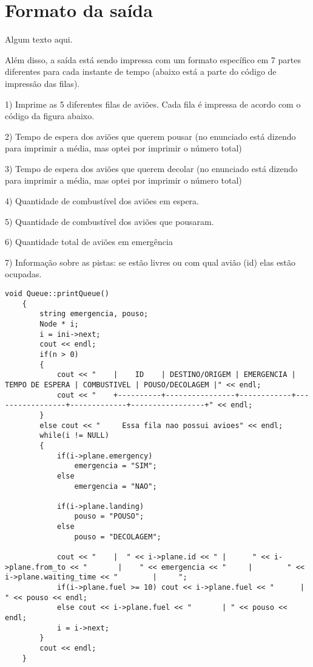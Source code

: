 \documentclass[a4paper,11pt]{article}
\theoremstyle{mytheor}
\begin{document}
\section*{Formato da saída}

Algum texto aqui.\newline

Além disso, a saída está sendo impressa com um formato específico em 7 partes diferentes  para cada instante de tempo (abaixo está a parte do código de impressão das filas).\newline

1) Imprime as 5 diferentes filas de aviões. Cada fila é impressa de acordo com o código da figura abaixo. \newline

2) Tempo de espera dos aviões que querem pousar (no enunciado está dizendo para imprimir a média, mas optei por imprimir o número total)\newline

3) Tempo de espera dos aviões que querem decolar (no enunciado está dizendo para imprimir a média, mas optei por imprimir o número total)\newline

4) Quantidade de combustível dos aviões em espera. \newline

5) Quantidade de combustível dos aviões que pousaram.\newline

6) Quantidade total de aviões em emergência \newline

7) Informação sobre as pistas: se estão livres ou com qual avião (id) elas estão ocupadas.\newline

\begin{lstlisting}[label={list:first},caption= Parte do código em queue.h que imprime informações dos aviões (C++).]
    void Queue::printQueue()
    {
        string emergencia, pouso;
        Node * i;
        i = ini->next;
        cout << endl;
        if(n > 0)
        { 
            cout << "    |    ID    | DESTINO/ORIGEM | EMERGENCIA | TEMPO DE ESPERA | COMBUSTIVEL | POUSO/DECOLAGEM |" << endl;
            cout << "    +----------+----------------+------------+-----------------+-------------+-----------------+" << endl;
        }
        else cout << "     Essa fila nao possui avioes" << endl;
        while(i != NULL)
        {
            if(i->plane.emergency)
                emergencia = "SIM";
            else
                emergencia = "NAO";

            if(i->plane.landing)
                pouso = "POUSO";
            else
                pouso = "DECOLAGEM";
            
            cout << "    |  " << i->plane.id << " |      " << i->plane.from_to << "       |    " << emergencia << "     |        " << i->plane.waiting_time << "        |     ";
            if(i->plane.fuel >= 10) cout << i->plane.fuel << "      | " << pouso << endl;
            else cout << i->plane.fuel << "       | " << pouso << endl;
            i = i->next;
        }
        cout << endl;
    }   
\end{lstlisting}
\end{document}
